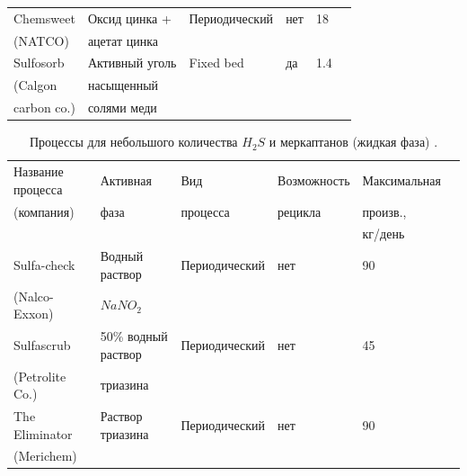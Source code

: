 \begin{table}
\begin{tabular}{lllllc}
		Chemsweet         & Оксид цинка +   & Периодический & нет         & \num{18}     &  \\
		(NATCO)           & ацетат цинка    &               &             &              &  \\
		Sulfosorb         & Активный уголь  & Fixed bed     & да          & \num{1,4}    &  \\
		(Calgon           & насыщенный      &               &             &              &  \\
		carbon co.)       & солями меди     &               &             &              &  \\ \bottomrule
	\end{tabular}
\end{table}

\begin{table}
	\centering
	\fontsize{12}{15}\selectfont %
	\captionsetup{justification=centering} %
	\caption{Процессы для небольшого количества $H_2S$ и меркаптанов (жидкая фаза) \cite{de_angelis_natural_2012}.} \label{tab:liquid}
	\begin{tabular}{lllllc}
		\toprule
		Название процесса & Активная            & Вид           & Возможность & Максимальная &  \\
		(компания)        & фаза                & процесса      & рецикла     & произв.,     &  \\
		                  &                     &               &             & кг/день      &  \\ \midrule
		Sulfa-check       & Водный раствор      & Периодический & нет         & \num{90}     &  \\
		(Nalco-Exxon)     & $NaNO_2$            &               &             &              &  \\
		Sulfascrub        & 50\% водный раствор & Периодический & нет         & \num{45}     &  \\
		(Petrolite Co.)   & триазина            &               &             &              &  \\
		The Eliminator    & Раствор триазина    & Периодический & нет         & \num{90}     &  \\
		(Merichem)        &                     &               &             &              &  \\ \bottomrule
	\end{tabular}
\end{table}

